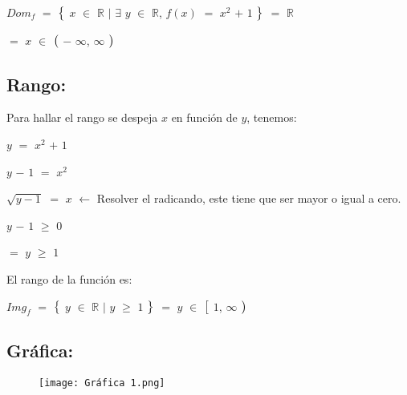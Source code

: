\documentclass[12pt]{article}
\begin{document}
\hspace{1cm} $Dom_{f}$ $=$ $\big{\{}$ $x$ $\in$ $\mathbb{R}$ $\mid$ $\exists$ $y$ $\in$ $\mathbb{R}$, $f(x)$ $=$ $x^{2}$ $+$ $1$ $\big{\}}$ $=$ $\mathbb{R}$ \vspace{0.5cm}

\hspace{11.1cm} $=$ $x$ $\in$ $\big{(}$ $-$ $\infty$, $\infty$ $\big{)}$ \vspace{0.5cm}

\subsection*{{\textcolor{Lochinvar}{\bfseries{Rango}:}}} Para hallar el rango se despeja $x$ en función de $y$, tenemos: \vspace{0.5cm}

\hspace{4cm} $y$ $=$ $x^{2}$ $+$ $1$

\hspace{4cm} $y$ $-$ $1$ $=$ $x^{2}$

\hspace{4cm} $\sqrt{y - 1}$ $=$ $x$ \hspace{0.2cm} $\longleftarrow$ \hspace{0.2cm} Resolver el radicando, este tiene que ser mayor o igual a cero. \vspace{0.5cm}

\hspace{4cm} $y$ $-$ $1$ $\geq$ $0$ \vspace{0.5cm}

\hspace{4cm} $=$ $y$ $\geq$ $1$ \vspace{0.5cm}

El rango de la función es: \vspace{0.5cm}

\hspace{4cm} $Img_{f}$ $=$ $\big{\{}$ $y$ $\in$ $\mathbb{R}$ $\mid$  $y$ $\geq$ $1$ $\big{\}}$ $=$ $y$ $\in$ $\big{[}$ $1$, $\infty$ $\big{)}$ \vspace{0.5cm}

\subsection*{{\textcolor{Lochinvar}{\bfseries{Gráfica}:}}} \vspace{0.5cm}

\begin{figure}[htb] \centering

    \texttt{[image: Gráfica 1.png]} 

\end{figure} \vspace{0.5cm}
\end{document}
